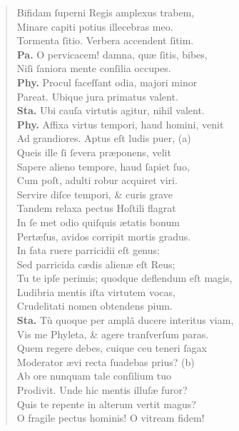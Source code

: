 \documentclass[a4paper,12pt]{article}
\begin{document}
\begin{verse}
Bifidam ſuperni Regis amplexus trabem,\\[0pt]
Minare capiti potius illecebras meo.\\[0pt]
Tormenta ſitio. Verbera accendent ſitim.\\[0pt]
\textbf{Pa.} O pervicacem! damna, quæ ſitis, bibes,\\[0pt]
Niſi ſaniora mente conſilia occupes.\\[0pt]
\textbf{Phy.} Procul faceſſant odia, majori minor\\[0pt]
Pareat. Ubique jura primatus valent.\\[0pt]
\textbf{Sta.} Ubi cauſa virtutis agitur, nihil valent.\\[0pt]
\textbf{Phy.} Affixa virtus tempori, haud homini, venit\\[0pt]
Ad grandiores. Aptus eſt ludis puer, (a)\footnotemark\\[0pt]
Queis ille ſi ſevera præponens, velit\\[0pt]
Sapere alieno tempore, haud ſapiet ſuo,\\[0pt]
Cum poſt, adulti robur acquiret viri.\\[0pt]
Servire diſce tempori, \& curis grave\\[0pt]
Tandem relaxa pectus Hoſtili flagrat\\[0pt]
In ſe met odio quiſquis ætatis bonum\\[0pt]
Pertæſus, avidos corripit mortis gradus.\\[0pt]
In fata ruere parricidii eſt genus:\\[0pt]
Sed parricida cædis alienæ eſt Reus;\\[0pt]
Tu te ipſe perimis; quodque deflendum eſt magis,\\[0pt]
Ludibria mentis iſta virtutem vocas,\\[0pt]
Crudelitati nomen obtendens pium.\\[0pt]
\textbf{Sta.} Tù quoque per amplã ducere interitus viam,\\[0pt]
Vis me Phyleta, \& agere tranſverſum paras.\\[0pt]
Quem regere debes, cuique ceu teneri ſagax\\[0pt]
Moderator ævi recta ſuadebas prius? (b)\footnotemark\\[0pt]
Ab ore nunquam tale conſilium tuo\\[0pt]
Prodivit. Unde hic mentis illuſæ furor?\\[0pt]
Quis te repente in alterum vertit magus?\\[0pt]
O fragile pectus hominis! O vitream fidem!\\[0pt]

\end{verse}
\end{document}
